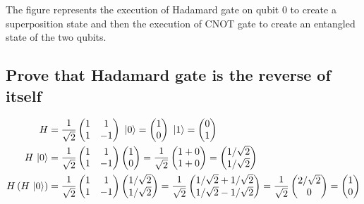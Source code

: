 	The figure represents the execution of Hadamard gate on qubit 0 to create a superposition state and then the execution of CNOT gate to create an entangled state of the two qubits.

	\subsection{Prove that Hadamard gate is the reverse of itself}

	\begin{align*}
		H&=\frac{1}{\sqrt{2}}\begin{pmatrix}1&1\\1&-1\end{pmatrix}\,\,\ket{0}=\begin{pmatrix}1\\0\end{pmatrix}\,\,\ket{1}=\begin{pmatrix}0\\1\end{pmatrix}\\
		H\,\ket{0}&=\frac{1}{\sqrt{2}}\begin{pmatrix}1&1\\1&-1\end{pmatrix}\begin{pmatrix}1\\0\end{pmatrix}=\frac{1}{\sqrt{2}}\begin{pmatrix}1+0\\1+0\end{pmatrix}=\begin{pmatrix}1/\sqrt{2}\\1/\sqrt{2}\end{pmatrix}\\
		H\,(H\,\ket{0})&=\frac{1}{\sqrt{2}}\begin{pmatrix}1&1\\1&-1\end{pmatrix}\begin{pmatrix}1/\sqrt{2}\\1/\sqrt{2}\end{pmatrix}=\frac{1}{\sqrt{2}}\begin{pmatrix}1/\sqrt{2}+1/\sqrt{2}\\1/\sqrt{2}-1/\sqrt{2}\end{pmatrix}=\frac{1}{\sqrt{2}}\begin{pmatrix}2/\sqrt{2}\\0\end{pmatrix}=\begin{pmatrix}1\\0\end{pmatrix}
	\end{align*}

